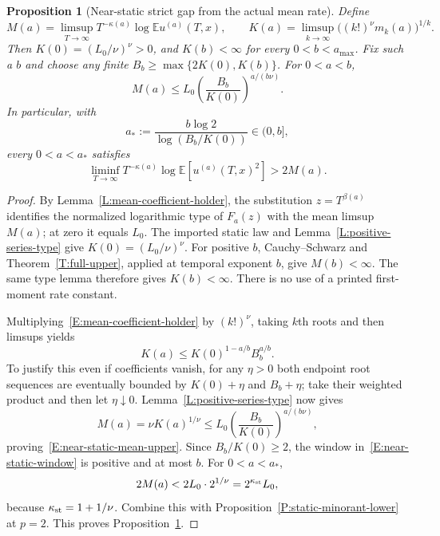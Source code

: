 \documentclass[12pt]{article}
\numberwithin{equation}{section}
\newtheorem{proposition}[theorem]{Proposition}
\theoremstyle{definition}
\newcommand{\E}{\mathbb{E}}
\begin{document}
\begin{proposition}[Near-static strict gap from the actual mean rate]
  \label{P:near-static-mean-gap}
  Define
  \[
    M(a)=\limsup_{T\to\infty}T^{-\kappa(a)}\log\E u^{(a)}(T,x),\qquad
    K(a)=\limsup_{k\to\infty}\big((k!)^\nu m_k(a)\big)^{1/k}.
  \]
  Then $K(0)=(L_0/\nu)^\nu>0$, and $K(b)<\infty$ for every
  $0<b<a_{\max}$. Fix such a $b$ and choose any finite
  $B_b\ge\max\{2K(0),K(b)\}$. For $0<a<b$,
  \begin{equation}\label{E:near-static-mean-upper}
    M(a)\le L_0\left(\frac{B_b}{K(0)}\right)^{a/(b\nu)}.
  \end{equation}
  In particular, with
  \begin{equation}\label{E:near-static-window}
    a_*:=\frac{b\log2}{\log(B_b/K(0))}\in(0,b],
  \end{equation}
  every $0<a<a_*$ satisfies
  \begin{equation}\label{E:near-static-mean-gap}
    \liminf_{T\to\infty}T^{-\kappa(a)}\log\E[u^{(a)}(T,x)^2]
    >2M(a).
  \end{equation}
\end{proposition}

\begin{proof}
  By Lemma~\ref{L:mean-coefficient-holder}, the substitution
  $z=T^{\beta(a)}$ identifies the normalized logarithmic type of
  $F_a(z)$ with the mean limsup $M(a)$; at zero it equals $L_0$.
  The imported static law and Lemma~\ref{L:positive-series-type} give
  $K(0)=(L_0/\nu)^\nu$.
  For positive $b$, Cauchy--Schwarz and Theorem~\ref{T:full-upper},
  applied at temporal exponent $b$, give $M(b)<\infty$.
  The same type lemma therefore gives $K(b)<\infty$.
  There is no use of a printed first-moment rate constant.

  Multiplying~\eqref{E:mean-coefficient-holder} by $(k!)^\nu$,
  taking $k$th roots and then limsups yields
  \[
    K(a)\le K(0)^{1-a/b}B_b^{a/b}.
  \]
  To justify this even if coefficients vanish, for any $\eta>0$ both
  endpoint root sequences are eventually bounded by $K(0)+\eta$ and
  $B_b+\eta$; take their weighted product and then let $\eta\downarrow0$.
  Lemma~\ref{L:positive-series-type} now gives
  \[
    M(a)=\nu K(a)^{1/\nu}
    \le L_0\left(\frac{B_b}{K(0)}\right)^{a/(b\nu)},
  \]
  proving~\eqref{E:near-static-mean-upper}.
  Since $B_b/K(0)\ge2$, the window in~\eqref{E:near-static-window}
  is positive and at most $b$. For $0<a<a_*$,
  \[
    2M(a)<2L_0\cdot2^{1/\nu}
    =2^{\kappa_{\rm st}}L_0,
  \]
  because $\kappa_{\rm st}=1+1/\nu$.
  Combine this with Proposition~\ref{P:static-minorant-lower} at $p=2$.
  This proves Proposition~\ref{P:near-static-mean-gap}.
\end{proof}
\end{document}
